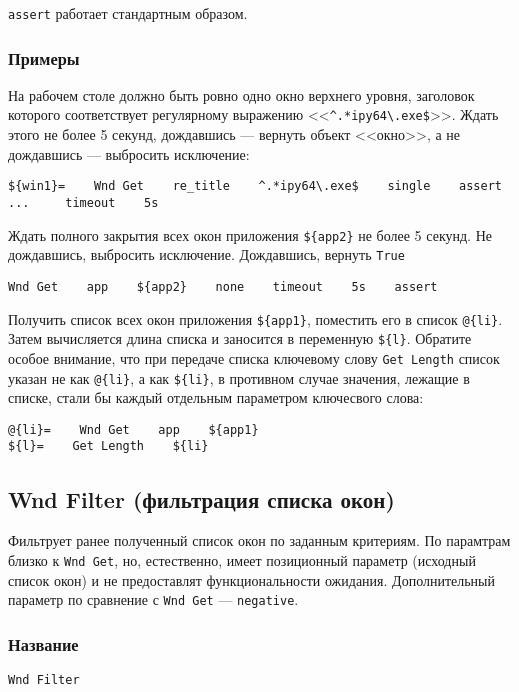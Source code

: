 \documentclass[11pt]{book} %
\begin{document}
\verb"assert" работает стандартным образом.


\subsubsection*{Примеры}
На рабочем столе должно быть ровно одно окно верхнего уровня, заголовок которого соответствует регулярному выражению <<\verb"^.*ipy64\.exe$">>. Ждать этого не более 5 секунд, дождавшись --- вернуть объект <<окно>>, а не дождавшись --- выбросить исключение:

\begin{verbatim}
${win1}=    Wnd Get    re_title    ^.*ipy64\.exe$    single    assert
...     timeout    5s
\end{verbatim}

Ждать полного закрытия всех окон приложения \verb"${app2}" не более 5 секунд. Не дождавшись, выбросить исключение. Дождавшись, вернуть \verb"True"
\begin{verbatim}
Wnd Get    app    ${app2}    none    timeout    5s    assert
\end{verbatim}

Получить список всех окон приложения \verb"${app1}", поместить его в список \verb"@{li}". Затем вычисляется длина списка и заносится в переменную \verb"${l}". Обратите особое внимание, что при передаче списка ключевому слову \verb"Get Length" список указан не как \verb"@{li}", а как \verb"${li}", в противном случае значения, лежащие в списке, стали бы каждый отдельным параметром ключесвого слова:
\begin{verbatim}
@{li}=    Wnd Get    app    ${app1}
${l}=    Get Length    ${li}
\end{verbatim}



\subsection{Wnd Filter (фильтрация списка окон)}
Фильтрует ранее полученный список окон по заданным критериям. По парамтрам близко к \verb"Wnd Get", но, естественно, имеет позиционный параметр (исходный список окон) и не предоставлят функциональности ожидания. Дополнительный параметр по сравнение с \verb"Wnd Get" --- \verb"negative".

\subsubsection*{Название}
\verb"Wnd Filter"
\end{document}
